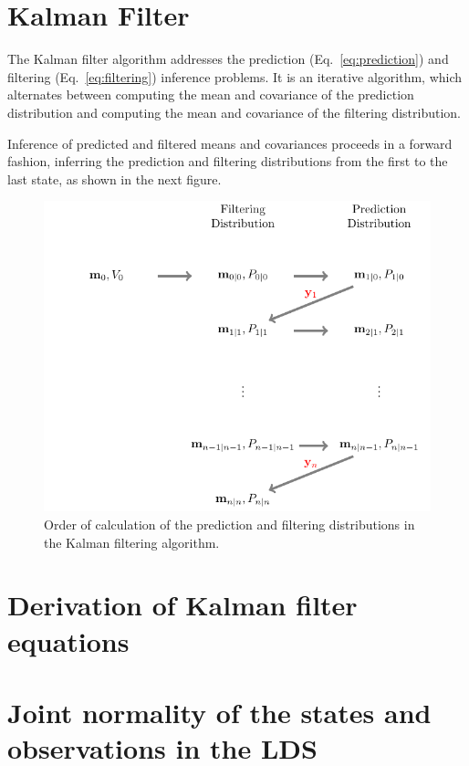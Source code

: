 \documentclass[12pt]{article}
\begin{document}
\section{Kalman Filter}

The Kalman filter algorithm addresses the prediction (Eq.~\ref{eq:prediction})
and filtering (Eq.~\ref{eq:filtering}) inference problems.
%
It is an iterative algorithm, which alternates between computing the mean and
covariance of the prediction distribution and computing the mean and covariance
of the filtering distribution.

Inference of predicted and filtered means and covariances proceeds in a forward
fashion, inferring the prediction and filtering distributions from the first to
the last state, as shown in the next figure.

\begin{figure}[h]
\begin{center}
    \includegraphics[width=5in]{figures/kfAlternations.pdf}
    \caption{Order of calculation of the prediction and filtering distributions
    in the Kalman filtering algorithm.}
    \label{fig:kfAlternations.}
\end{center}
\end{figure}

\section{Derivation of Kalman filter equations}



\section{Joint normality of the states and observations in the LDS}
\end{document}
